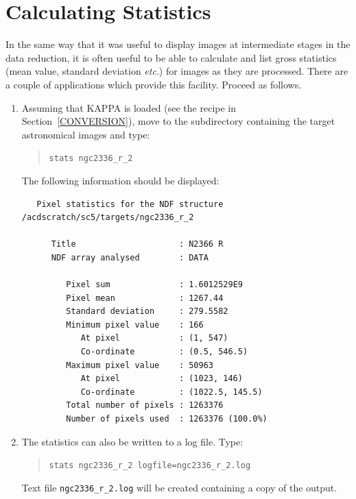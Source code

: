 \documentclass[twoside,11pt]{article}
\newcommand{\xlabel}[1]{}
\begin{document}
\newpage
\section{\xlabel{STATISTICS}\label{STATISTICS}Calculating Statistics}

In the same way that it was useful to display images at intermediate
stages in the data reduction, it is often useful to be able to calculate
and list gross statistics (mean value, standard deviation  \emph{etc}.)
for images as they are processed.  There are a couple of applications
which provide this facility.  Proceed as follows.

\begin{enumerate}

  \item Assuming that KAPPA is loaded (see the recipe in
   Section~\ref{CONVERSION}),    move to the subdirectory containing the
   target astronomical images and type:

  \begin{quote}
   {\tt stats ngc2336\_r\_2}
  \end{quote}

   The following information should be displayed:

  \begin{verbatim}
   Pixel statistics for the NDF structure /acdscratch/sc5/targets/ngc2336_r_2

      Title                     : N2366 R
      NDF array analysed        : DATA

         Pixel sum              : 1.6012529E9
         Pixel mean             : 1267.44
         Standard deviation     : 279.5582
         Minimum pixel value    : 166
            At pixel            : (1, 547)
            Co-ordinate         : (0.5, 546.5)
         Maximum pixel value    : 50963
            At pixel            : (1023, 146)
            Co-ordinate         : (1022.5, 145.5)
         Total number of pixels : 1263376
         Number of pixels used  : 1263376 (100.0%)
\end{verbatim}

  \item The statistics can also be written to a log file.  Type:

  \begin{quote}
   {\tt stats ngc2336\_r\_2 logfile=ngc2336\_r\_2.log}
  \end{quote}

   Text file {\tt ngc2336\_r\_2.log} will be created containing a copy
   of the output.


\end{enumerate}
\end{document}
